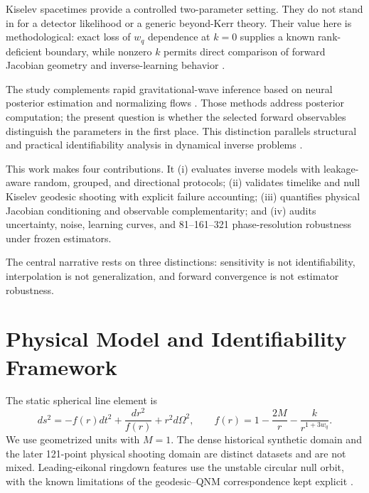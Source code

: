 \documentclass[11pt]{article}
\newcommand{\wq}{w_q}
\begin{document}
Kiselev spacetimes provide a controlled two-parameter setting. They do not
stand in for a detector likelihood or a generic beyond-Kerr theory. Their value
here is methodological: exact loss of $\wq$ dependence at $k=0$ supplies a known
rank-deficient boundary, while nonzero $k$ permits direct comparison of forward
Jacobian geometry and inverse-learning behavior \cite{kiselev2003quintessence}.

The study complements rapid gravitational-wave inference based on neural
posterior estimation and normalizing flows
\cite{dax2021realtime,green2020autoregressive,gabbard2022cvae,cranmer2020frontier,papamakarios2021normalizing}.
Those methods address posterior computation; the present question is whether
the selected forward observables distinguish the parameters in the first
place. This distinction parallels structural and practical identifiability
analysis in dynamical inverse problems \cite{raue2009identifiability,villaverde2019identifiability}.

This work makes four contributions. It (i) evaluates inverse models with
leakage-aware random, grouped, and directional protocols; (ii) validates
timelike and null Kiselev geodesic shooting with explicit failure accounting;
(iii) quantifies physical Jacobian conditioning and observable
complementarity; and (iv) audits uncertainty, noise, learning curves, and
81--161--321 phase-resolution robustness under frozen estimators.

The central narrative rests on three distinctions: sensitivity is not
identifiability, interpolation is not generalization, and forward convergence
is not estimator robustness.

\section{Physical Model and Identifiability Framework}
The static spherical line element is
\begin{equation}
 ds^2=-f(r)dt^2+\frac{dr^2}{f(r)}+r^2d\Omega^2,
 \qquad f(r)=1-\frac{2M}{r}-\frac{k}{r^{1+3\wq}}.
\end{equation}
We use geometrized units with $M=1$. The dense historical synthetic domain and
the later 121-point physical shooting domain are distinct datasets and are not
mixed. Leading-eikonal ringdown features use the unstable circular null orbit,
with the known limitations of the geodesic--QNM correspondence kept explicit
\cite{cardoso2009geodesic,konoplya2017correspondence,palominoylla2026ringdown}.
\end{document}
